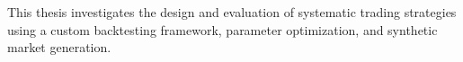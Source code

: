 This thesis investigates the design and evaluation of systematic trading strategies using a custom backtesting framework, parameter optimization, and synthetic market generation.

